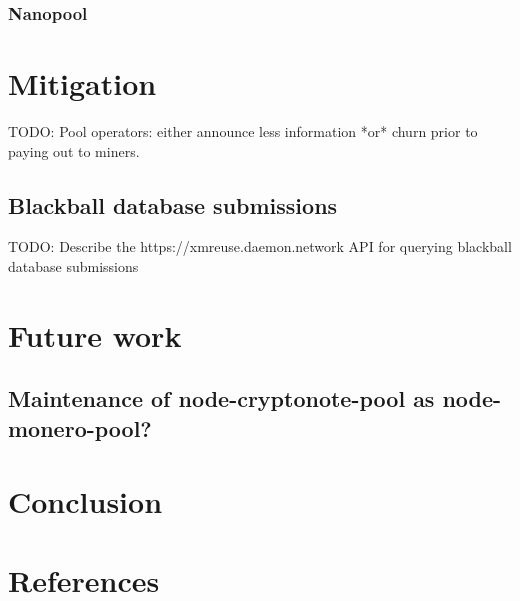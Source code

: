 \documentclass[notitlepage]{report}
\begin{document}
\subsubsection{Nanopool} \label{nanopool}

\section{Mitigation}

TODO: Pool operators: either announce less information *or* churn prior to paying out to miners.

\subsection{Blackball database submissions}

TODO: Describe the https://xmreuse.daemon.network API for querying blackball database submissions

\section{Future work}

\subsection{Maintenance of node-cryptonote-pool as node-monero-pool?}

\section{Conclusion}

\section{References}
\end{document}
